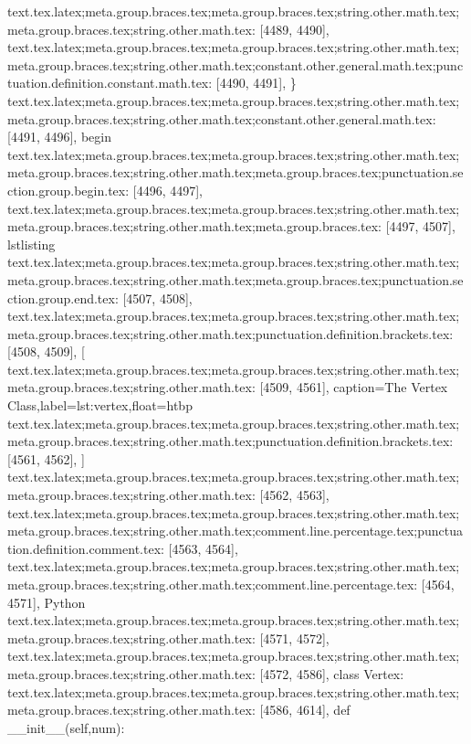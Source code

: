 {{{{{{{{{{{{{{{{{{{{{{{{{{{{{{{{{{{{{{{{{{{{{{{{{{{{{{{{{{{{{{{{{{{{{{{{{{{{{{{{{{{{{{{{{{{{{{{{{{{{{{{{{{{{{{{{{{{{{{{{{{{{{{{{{{{{{{{{{{{{{{text.tex.latex;meta.group.braces.tex;meta.group.braces.tex;string.other.math.tex;meta.group.braces.tex;string.other.math.tex: [4489, 4490], {
}
text.tex.latex;meta.group.braces.tex;meta.group.braces.tex;string.other.math.tex;meta.group.braces.tex;string.other.math.tex;constant.other.general.math.tex;punctuation.definition.constant.math.tex: [4490, 4491], {\}
text.tex.latex;meta.group.braces.tex;meta.group.braces.tex;string.other.math.tex;meta.group.braces.tex;string.other.math.tex;constant.other.general.math.tex: [4491, 4496], {begin}
text.tex.latex;meta.group.braces.tex;meta.group.braces.tex;string.other.math.tex;meta.group.braces.tex;string.other.math.tex;meta.group.braces.tex;punctuation.section.group.begin.tex: [4496, 4497], {{}
text.tex.latex;meta.group.braces.tex;meta.group.braces.tex;string.other.math.tex;meta.group.braces.tex;string.other.math.tex;meta.group.braces.tex: [4497, 4507], {lstlisting}
text.tex.latex;meta.group.braces.tex;meta.group.braces.tex;string.other.math.tex;meta.group.braces.tex;string.other.math.tex;meta.group.braces.tex;punctuation.section.group.end.tex: [4507, 4508], {}}
text.tex.latex;meta.group.braces.tex;meta.group.braces.tex;string.other.math.tex;meta.group.braces.tex;string.other.math.tex;punctuation.definition.brackets.tex: [4508, 4509], {[}
text.tex.latex;meta.group.braces.tex;meta.group.braces.tex;string.other.math.tex;meta.group.braces.tex;string.other.math.tex: [4509, 4561], {caption=The Vertex Class,label=lst:vertex,float=htbp}
text.tex.latex;meta.group.braces.tex;meta.group.braces.tex;string.other.math.tex;meta.group.braces.tex;string.other.math.tex;punctuation.definition.brackets.tex: [4561, 4562], {]}
text.tex.latex;meta.group.braces.tex;meta.group.braces.tex;string.other.math.tex;meta.group.braces.tex;string.other.math.tex: [4562, 4563], { }
text.tex.latex;meta.group.braces.tex;meta.group.braces.tex;string.other.math.tex;meta.group.braces.tex;string.other.math.tex;comment.line.percentage.tex;punctuation.definition.comment.tex: [4563, 4564], {%
text.tex.latex;meta.group.braces.tex;meta.group.braces.tex;string.other.math.tex;meta.group.braces.tex;string.other.math.tex;comment.line.percentage.tex: [4564, 4571], { Python}
text.tex.latex;meta.group.braces.tex;meta.group.braces.tex;string.other.math.tex;meta.group.braces.tex;string.other.math.tex: [4571, 4572], {
}
text.tex.latex;meta.group.braces.tex;meta.group.braces.tex;string.other.math.tex;meta.group.braces.tex;string.other.math.tex: [4572, 4586], {class Vertex:
}
text.tex.latex;meta.group.braces.tex;meta.group.braces.tex;string.other.math.tex;meta.group.braces.tex;string.other.math.tex: [4586, 4614], {    def __init__(self,num):
}}}}}}}}}}}}}}}}}}}}}}}}}}}}}}}}}}}}}}}}}}}}}}}}}}}}}}}}}}}}}}}}}}}}}}}}}}}}}}}}}}}}}}}}}}}}}}}}}}}}}}}}}}}}}}}}}}}}}}}}}}}}}}}}}}}}}}}}}}}}}}}}}

